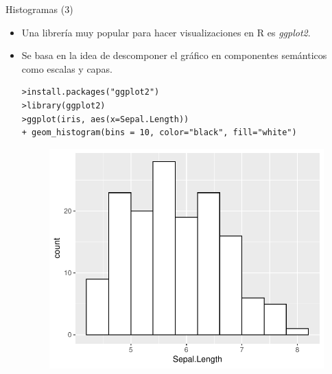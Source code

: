 \documentclass[handout]{beamer}
\begin{document}
\begin{frame}[fragile]{Histogramas (3) }
\scriptsize{
\begin{itemize}
 \item Una librería muy popular para hacer visualizaciones en R es \emph{ggplot2}.
 \item Se basa en la idea de descomponer el gráfico en componentes semánticos como escalas y capas.
 
 \begin{verbatim}
>install.packages("ggplot2")
>library(ggplot2)
>ggplot(iris, aes(x=Sepal.Length)) 
+ geom_histogram(bins = 10, color="black", fill="white")
 \end{verbatim}
 \begin{figure}[h!]
	\centering
	\includegraphics[scale=0.4]{pics/hist3.pdf}
	
	
\end{figure} 

\end{itemize}

}
\end{frame}
\end{document}
